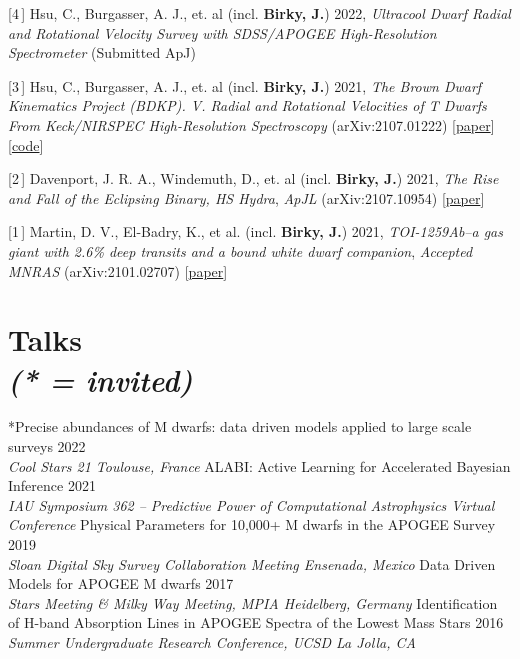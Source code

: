\documentclass[margin,line]{resume}
\newcommand{\nlist}[1]{{\color{bcolor} [#1\,]}}
\begin{document}
\begin{resume}
\newpage

\nlist{4} Hsu, C., Burgasser, A. J., et. al (incl. \textbf{Birky, J.}) 2022, \textsl{Ultracool Dwarf Radial and Rotational Velocity Survey with SDSS/APOGEE High-Resolution Spectrometer} (Submitted ApJ)

\nlist{3} Hsu, C., Burgasser, A. J., et. al (incl. \textbf{Birky, J.}) 2021, \textsl{The Brown Dwarf Kinematics Project (BDKP). V. Radial and Rotational Velocities of T Dwarfs From Keck/NIRSPEC High-Resolution Spectroscopy} (arXiv:2107.01222) [\href{https://arxiv.org/abs/2107.01222}{paper}] [\href{https://github.com/chihchunhsu/smart}{code}]

\nlist{2} Davenport, J. R. A., Windemuth, D., et. al (incl. \textbf{Birky, J.}) 2021, \textsl{The Rise and Fall of the Eclipsing Binary, HS Hydra}, \textit{ApJL} (arXiv:2107.10954) [\href{https://arxiv.org/abs/2107.10954}{paper}]

\nlist{1} Martin, D. V., El-Badry, K., et al. (incl. \textbf{Birky, J.}) 2021, \textsl{TOI-1259Ab--a gas giant with 2.6\% deep transits and a bound white dwarf companion}, \textit{Accepted MNRAS} (arXiv:2101.02707) [\href{https://arxiv.org/abs/2101.02707}{paper}]


\section{\mysidestyle \textcolor{bcolor}{Talks} \\ \textit{(* = invited)}}
*Precise abundances of M dwarfs: data driven models applied to large scale surveys \hfill 2022 \\
\textsl{Cool Stars 21 \hfill Toulouse, France}\vspace{.2cm} \newline
ALABI: Active Learning for Accelerated Bayesian Inference \hfill 2021 \\
\textsl{IAU Symposium 362 -- Predictive Power of Computational Astrophysics \hfill Virtual Conference}\vspace{.2cm} \newline
Physical Parameters for 10,000+ M dwarfs in the APOGEE Survey \hfill 2019 \\ 
\textsl{Sloan Digital Sky Survey Collaboration Meeting \hfill Ensenada, Mexico}\vspace{.2cm} \newline
Data Driven Models for APOGEE M dwarfs \hfill 2017 \\ 
\textsl{Stars Meeting  \& Milky Way Meeting, MPIA \hfill Heidelberg, Germany}\vspace{.2cm} \newline
Identification of H-band Absorption Lines in APOGEE Spectra of the Lowest Mass Stars \hfill 2016 \\ 
\textsl{Summer Undergraduate Research Conference, UCSD \hfill La Jolla, CA}



\end{resume}
\end{document}
